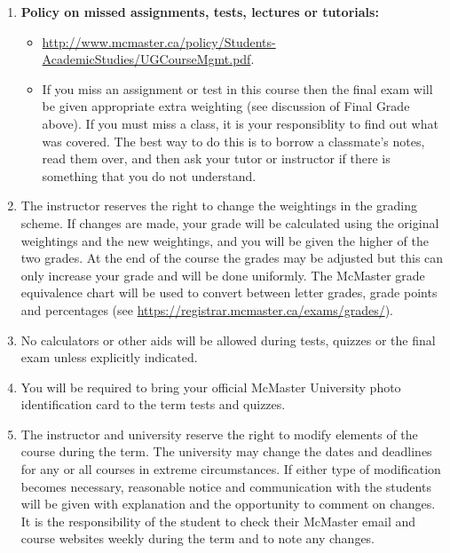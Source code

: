 \documentclass[12pt]{article}
\begin{document}
\begin{enumerate}\addtolength{\itemsep}{-0.5\baselineskip}

\item \hypertarget{note1}{}{\bf Policy on missed assignments, tests, lectures or tutorials:} 
\begin{itemize}
\item \url{http://www.mcmaster.ca/policy/Students-AcademicStudies/UGCourseMgmt.pdf}.
\item If you miss an assignment or test in this course then the final exam will be given appropriate extra weighting (see discussion of Final Grade above).  If you must miss a class, it is your responsiblity to find out what was covered.  The best way to do this is to borrow a classmate's notes, read them over, and then ask your tutor or instructor if there is something that you do not understand.
\end{itemize}

\item The instructor reserves the right to change the weightings in the grading scheme. If changes are made, your grade will be calculated using the original weightings and the new weightings, and you will be given the higher of the two grades.  At the end of the course the grades may be adjusted but this can only increase your grade and will be done uniformly.  The McMaster grade equivalence chart will be used to convert between letter grades, grade points and percentages (see \url{https://registrar.mcmaster.ca/exams/grades/}).

\item No calculators or other aids will be allowed during tests, quizzes or the final exam unless explicitly indicated.

\item You will be required to bring your official McMaster University photo identification card to the term tests and quizzes.

\item The instructor and university reserve the right to modify elements of the course during the term.  The university may change the dates and deadlines for any or all courses in extreme circumstances.  If either type of modification becomes necessary, reasonable notice and communication with the students will be given with explanation and the opportunity to comment on changes.  It is the responsibility of the student to check their McMaster email and course websites weekly during the term and to note any changes.

\end{enumerate}
\end{document}
